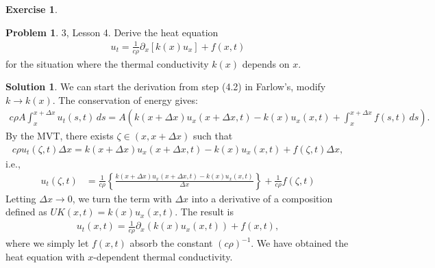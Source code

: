\documentclass{article}
\theoremstyle{definition}
\newtheorem*{prob*}{Problem}
\newtheorem{exer}{Exercise}[section]
\newtheorem*{sln*}{Solution}
\newcommand{\p}{\partial}
\begin{document}
\begin{exer}
	\begin{prob*}3, Lesson 4. Derive the heat equation
		\begin{align*}
		u_t = \frac{1}{c\rho}\p_x[k(x)u_x] + f(x,t)
		\end{align*}
		for the situation where the thermal conductivity $k(x)$ depends on $x$.\\
		\begin{sln*}
			We can start the derivation from step (4.2) in Farlow's, modify $k \to k(x)$. The conservation of energy gives:
			\begin{align*}
			c\rho A\int_{x}^{x+\Delta x}u_t(s,t)\,ds = A\left(k(x+\Delta x)u_x(x+\Delta x,t) - k(x)u_x(x,t)  + \int_x^{x+\Delta x}f(s,t)\,ds \right).
			\end{align*}
			By the MVT, there exists $\zeta \in (x,x+\Delta x)$ such that
			\begin{align*}
			c\rho u_t(\zeta, t)\Delta x = k(x+\Delta x)u_x(x+\Delta x,t) - k(x)u_x(x,t) + f(\zeta,t)\Delta x,
			\end{align*} 
			i.e.,
			\begin{align*}
			u_t(\zeta,t) &= \frac{1}{c\rho}\left\{ \frac{k(x+\Delta x)u_x(x+\Delta x,t) - k(x)u_x(x,t)}{\Delta x} \right\} + \frac{1}{c\rho}f(\zeta,t)
			\end{align*}
			Letting $\Delta x \to 0$, we turn the term with $\Delta x$ into a derivative of a composition defined as $UK(x,t) = k(x)u_x(x,t)$. The result is
			\begin{align*}
			u_t(x,t) = \frac{1}{c\rho}\p_x(k(x)u_x(x,t)) + f(x,t),
			\end{align*}
			where we simply let $f(x,t)$ absorb the constant $(c\rho)^{-1}$. We have obtained the heat equation with $x$-dependent thermal conductivity. 
		\end{sln*}
	\end{prob*}
\end{exer}

\newpage
\end{document}
